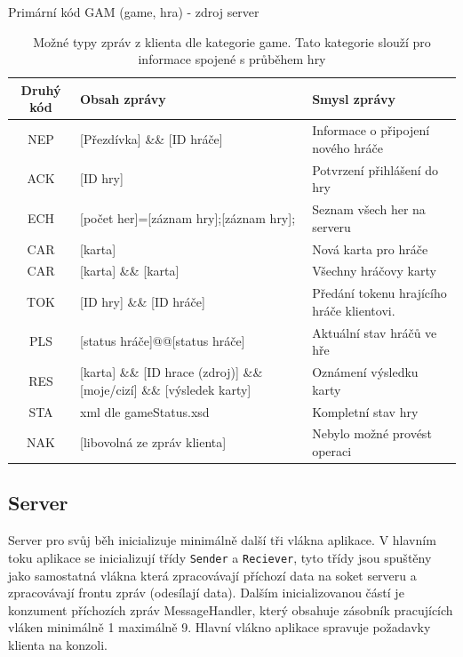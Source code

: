 \documentclass[12pt, a4paper]{article}
\begin{document}
\begin{table}[H]%
\centering
Primární kód GAM (game, hra) - zdroj server
\begin{tabular}{|c | p{4cm} | p{5cm} |}
\hline
Druhý kód & Obsah zprávy & Smysl zprávy\\
\hline
NEP  & [Přezdívka]    \&\&    [ID hráče] & Informace o připojení nového hráče \\
\hline
ACK  &[ID hry] & Potvrzení přihlášení do hry\\
\hline
ECH &[počet her]=[záznam hry];[záznam hry]; & Seznam všech her na serveru \\
\hline
CAR &[karta] & Nová karta pro hráče \\
\hline
CAR &[karta]    \&\&    [karta] & Všechny hráčovy karty \\
\hline
TOK &[ID hry]    \&\&    [ID hráče] & Předání tokenu hrajícího hráče klientovi. \\
\hline
PLS & [status hráče]@@[status hráče] & Aktuální stav hráčů ve hře \\
\hline
RES &[karta]   \&\&   [ID hrace (zdroj)]   \&\&   [moje/cizí]   \&\&   [výsledek karty] & Oznámení výsledku karty \\
\hline
STA & xml dle gameStatus.xsd & Kompletní stav hry \\
\hline
NAK & [libovolná ze zpráv klienta] & Nebylo možné provést operaci \\
\hline

\end{tabular}
\label{tab:zpravyGamServer}
\caption{Možné typy zpráv z klienta dle kategorie game. Tato kategorie slouží pro informace spojené s průběhem hry}
\end{table}

\subsection{Server}

Server pro svůj běh inicializuje minimálně další tři vlákna aplikace. V hlavním toku aplikace se inicializují třídy \texttt{Sender} a \texttt{Reciever}, tyto třídy jsou spuštěny jako samostatná vlákna která zpracovávají příchozí data na soket serveru a zpracovávají frontu zpráv (odesílají data). Dalším inicializovanou částí je konzument příchozích zpráv MessageHandler, který obsahuje zásobník pracujících vláken minimálně 1 maximálně 9. Hlavní vlákno aplikace spravuje požadavky klienta na konzoli.
\end{document}
